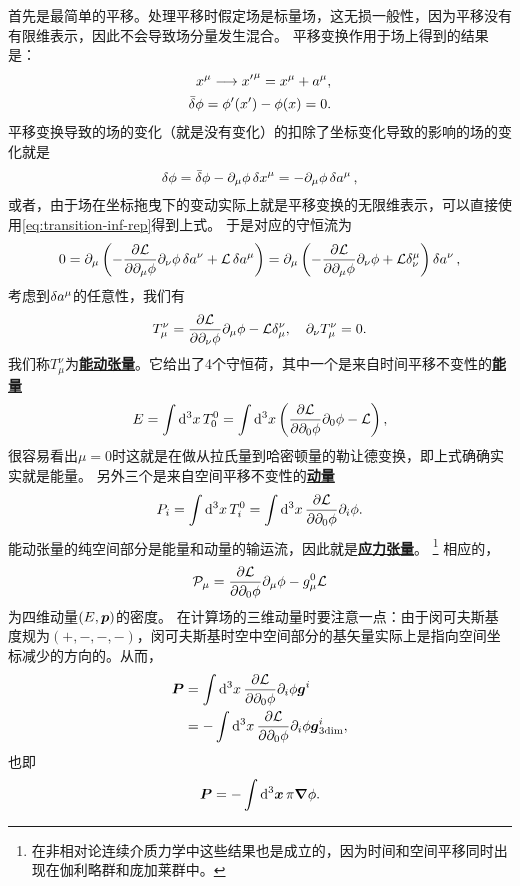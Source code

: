 \documentclass[hyperref, UTF8, a4paper]{ctexart}
\newcommand{\concept}[1]{\underline{\textbf{#1}}}
\begin{document}
首先是最简单的平移。处理平移时假定场是标量场，这无损一般性，因为平移没有有限维表示，因此不会导致场分量发生混合。
平移变换作用于场上得到的结果是：
\[
    \begin{split}
        x^\mu \longrightarrow {x'}^{\mu} = x^\mu + a^\mu, \\
        \bar{\var}{\phi} = \phi'(x') - \phi(x) = 0.
    \end{split}
\]
平移变换导致的场的变化（就是没有变化）的扣除了坐标变化导致的影响的场的变化就是
\[
    \var{\phi} = \bar{\var}{\phi} - \partial_\mu \phi \var{x}^\mu = - \partial_\mu \phi \var{a^\mu},
\]
或者，由于场在坐标拖曳下的变动实际上就是平移变换的无限维表示，可以直接使用\eqref{eq:transition-inf-rep}得到上式。
于是对应的守恒流为
\[
    0 = \partial_\mu \left( - \pdv{\mathcal{L}}{\partial_\mu \phi} \partial_\nu \phi \var{a^\nu} + \mathcal{L} \var{a^\mu} \right) 
    = \partial_\mu \left( - \pdv{\mathcal{L}}{\partial_\mu \phi} \partial_\nu \phi + \mathcal{L} \delta^\mu_\nu \right) \var{a^\nu},
\]
考虑到$\var{a^\mu}$的任意性，我们有
\begin{equation}
    T_\mu^\nu = \pdv{\mathcal{L}}{\partial_\nu \phi} \partial_\mu \phi - \mathcal{L} \delta^\nu_\mu, \quad \partial_\nu T_\mu^\nu = 0.
\end{equation}
我们称$T^\nu_\mu$为\concept{能动张量}。它给出了4个守恒荷，其中一个是来自时间平移不变性的\concept{能量}
\begin{equation}
    E = \int \dd[3]{x} T^0_0 = \int \dd[3]{x} \left( \pdv{\mathcal{L}}{\partial_0 \phi} \partial_0 \phi - \mathcal{L} \right) ,
    \label{eq:field-energy}
\end{equation}
很容易看出$\mu=0$时这就是在做从拉氏量到哈密顿量的勒让德变换，即上式确确实实就是能量。
另外三个是来自空间平移不变性的\concept{动量}
\begin{equation}
    P_i = \int \dd[3]{x} T^0_i = \int \dd[3]{x} \pdv{\mathcal{L}}{\partial_0 \phi} \partial_i \phi .
    \label{eq:field-momentum}
\end{equation}
能动张量的纯空间部分是能量和动量的输运流，因此就是\concept{应力张量}。%
\footnote{在非相对论连续介质力学中这些结果也是成立的，因为时间和空间平移同时出现在伽利略群和庞加莱群中。}
相应的，
\begin{equation}
    \mathcal{P}_\mu = \pdv{\mathcal{L}}{\partial_0 \phi} \partial_\mu \phi - g_\mu^0 \mathcal{L}
\end{equation}
为四维动量$(E, \vb*{p})$的密度。
在计算场的三维动量时要注意一点：由于闵可夫斯基度规为$(+, -, -, -)$，闵可夫斯基时空中空间部分的基矢量实际上是指向空间坐标减少的方向的。从而，
\[
    \begin{aligned}
        \vb*{P} &= \int \dd[3]{x} \pdv{\mathcal{L}}{\partial_0 \phi} \partial_i \phi \vb*{g}^i \\
        &= - \int \dd[3]{x} \pdv{\mathcal{L}}{\partial_0 \phi} \partial_i \phi \vb*{g}^i_{\text{3dim}},
    \end{aligned}
\]
也即
\begin{equation}
    \vb*{P} = - \int \dd[3]{\vb*{x}} \pi \grad{\phi}.
\end{equation}
\end{document}
